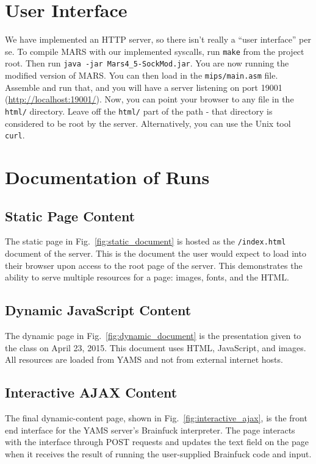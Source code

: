 \documentclass[journal,10pt]{IEEEtran}
\begin{document}
\section{User Interface}

We have implemented an HTTP server, so there isn't really a ``user interface''
per se. To compile MARS with our implemented syscalls, run \texttt{make} from
the project root. Then run \texttt{java -jar Mars4\_5-SockMod.jar}. You are now
running the modified version of MARS. You can then load in the
\texttt{mips/main.asm} file. Assemble and run that, and you will have a server
listening on port 19001 (\url{http://localhost:19001/}). Now, you can point your
browser to any file in the \texttt{html/} directory. Leave off the
\texttt{html/} part of the path - that directory is considered to be root by the
server. Alternatively, you can use the Unix tool \texttt{curl}.

\section{Documentation of Runs}

\subsection{Static Page Content}

The static page in Fig.~\ref{fig:static_document} is hosted as the
\texttt{/index.html} document of the server. This is the document the user would
expect to load into their browser upon access to the root page of the server.
This demonstrates the ability to serve multiple resources for a page: images,
fonts, and the HTML.

\subsection{Dynamic JavaScript Content}

The dynamic page in Fig.~\ref{fig:dynamic_document} is the presentation given to
the class on April 23, 2015. This document uses HTML, JavaScript, and images.
All resources are loaded from YAMS and not from external internet hosts.

\subsection{Interactive AJAX Content}

The final dynamic-content page, shown in Fig.~\ref{fig:interactive_ajax}, is the
front end interface for the YAMS server's Brainfuck\cite{Mpreu/preller}
interpreter. The page interacts with the interface through POST requests and
updates the text field on the page when it receives the result of running the
user-supplied Brainfuck code and input.
\end{document}
